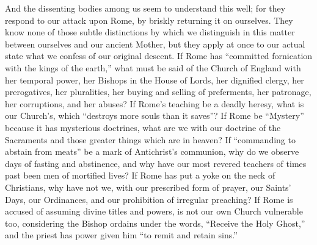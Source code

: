 And the dissenting bodies among us seem to
understand this well; for they respond to our attack upon Rome, by
briskly returning it on ourselves. They know none of those subtle
distinctions by which we distinguish in this matter between ourselves
and our ancient Mother, but they apply at once to our actual state
what we confess of our original descent. If Rome has ``committed
fornication with the kings of the earth,'' what must be said of the
Church of England with her temporal power, her Bishops in the House of
Lords, her dignified clergy, her prerogatives, her pluralities, her
buying and selling of preferments, her patronage, her
corruptions, and her abuses? If Rome's teaching be a deadly heresy,
what is our Church's, which ``destroys more souls than it saves''?
If Rome be ``Mystery'' because it has mysterious doctrines, what
are we with our doctrine of the Sacraments and those greater things
which are in heaven? If ``commanding to abstain from meats'' be a
mark of Antichrist's communion, why do we observe days of fasting
and abstinence, and why have our most revered teachers of times past
been men of mortified lives? If Rome has put a yoke on the neck of
Christians, why have not we, with our prescribed form of prayer, our
Saints' Days, our Ordinances, and our prohibition of irregular
preaching? If Rome is accused of assuming divine titles and powers, is
not our own Church vulnerable too, considering the Bishop ordains
under the words, ``Receive the Holy Ghost,'' and the priest has
power given him ``to remit and retain sins.''

